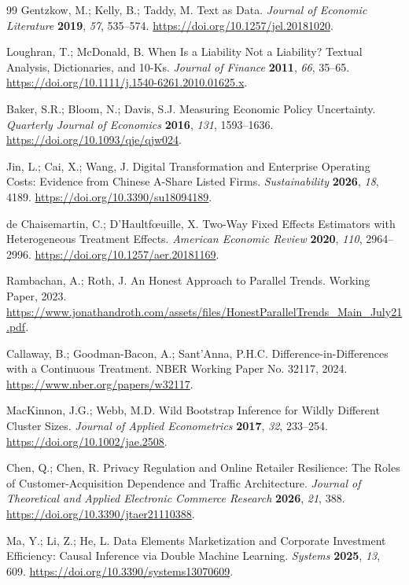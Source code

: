 \begin{thebibliography}{99}
Gentzkow, M.; Kelly, B.; Taddy, M. Text as Data. \textit{Journal of Economic Literature} \textbf{2019}, \textit{57}, 535--574. \url{https://doi.org/10.1257/jel.20181020}.

Loughran, T.; McDonald, B. When Is a Liability Not a Liability? Textual Analysis, Dictionaries, and 10-Ks. \textit{Journal of Finance} \textbf{2011}, \textit{66}, 35--65. \url{https://doi.org/10.1111/j.1540-6261.2010.01625.x}.

Baker, S.R.; Bloom, N.; Davis, S.J. Measuring Economic Policy Uncertainty. \textit{Quarterly Journal of Economics} \textbf{2016}, \textit{131}, 1593--1636. \url{https://doi.org/10.1093/qje/qjw024}.

Jin, L.; Cai, X.; Wang, J. Digital Transformation and Enterprise Operating Costs: Evidence from Chinese A-Share Listed Firms. \textit{Sustainability} \textbf{2026}, \textit{18}, 4189. \url{https://doi.org/10.3390/su18094189}.

de Chaisemartin, C.; D'Haultf{\oe}uille, X. Two-Way Fixed Effects Estimators with Heterogeneous Treatment Effects. \textit{American Economic Review} \textbf{2020}, \textit{110}, 2964--2996. \url{https://doi.org/10.1257/aer.20181169}.

Rambachan, A.; Roth, J. An Honest Approach to Parallel Trends. Working Paper, 2023. \url{https://www.jonathandroth.com/assets/files/HonestParallelTrends_Main_July21.pdf}.

Callaway, B.; Goodman-Bacon, A.; Sant'Anna, P.H.C. Difference-in-Differences with a Continuous Treatment. NBER Working Paper No. 32117, 2024. \url{https://www.nber.org/papers/w32117}.

MacKinnon, J.G.; Webb, M.D. Wild Bootstrap Inference for Wildly Different Cluster Sizes. \textit{Journal of Applied Econometrics} \textbf{2017}, \textit{32}, 233--254. \url{https://doi.org/10.1002/jae.2508}.

Chen, Q.; Chen, R. Privacy Regulation and Online Retailer Resilience: The Roles of Customer-Acquisition Dependence and Traffic Architecture. \textit{Journal of Theoretical and Applied Electronic Commerce Research} \textbf{2026}, \textit{21}, 388. \url{https://doi.org/10.3390/jtaer21110388}.

Ma, Y.; Li, Z.; He, L. Data Elements Marketization and Corporate Investment Efficiency: Causal Inference via Double Machine Learning. \textit{Systems} \textbf{2025}, \textit{13}, 609. \url{https://doi.org/10.3390/systems13070609}.


\end{thebibliography}
